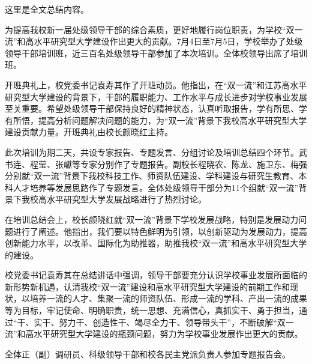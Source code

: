 
\begin{summary}

这里是全文总结内容。

为提高我校新一届处级领导干部的综合素质，更好地履行岗位职责，为学校“双一流”和高水平研究型大学建设作出更大的贡献。7月4日至7月5日，学校举办了处级领导干部培训班，近三百名处级领导干部参加了本次培训。全体校领导出席了培训班。

开班典礼上，校党委书记袁寿其作了开班动员。他指出，在“双一流”和江苏高水平研究型大学建设的背景下，干部的履职能力、工作水平与成长进步对学校事业发展至关重要。希望处级领导干部保持良好的精神状态，认真听取报告，学有所思、学有所悟，提高分析问题解决问题的能力，为“双一流”背景下我校高水平研究型大学建设贡献力量。开班典礼由校长颜晓红主持。

此次培训为期二天，共设专家报告、专题发言、分组讨论及培训总结四个环节。武书连、程莹、张巘等专家分别作了专题报告。副校长程晓农、陈龙、施卫东、梅强分别就“双一流”背景下我校科技工作、师资队伍建设、学科建设与研究生教育、本科人才培养等发展思路作了专题发言。全体处级领导干部分为11个组就“双一流”背景下我校高水平研究型大学发展战略进行了热烈讨论。      

在培训总结会上，校长颜晓红就“双一流”背景下学校发展战略，特别是发展动力问题进行了阐述。他指出，我们要以特色鲜明为引领，以创新驱动为发展动力，提高创新能力水平，以改革、国际化为助推器，助推我校“双一流”和高水平研究型大学的建设。

校党委书记袁寿其在总结讲话中强调，领导干部要充分认识学校事业发展所面临的新形势新机遇，认清我校“双一流”建设和高水平研究型大学建设的前期工作和现状，以培养一流的人才、集聚一流的师资队伍、形成一流的学科、产出一流的成果等为目标，牢记使命、明确职责，统一思想、充满信心，真抓实干、勇于担当，通过“干、实干、努力干、创造性干、竭尽全力干、领导带头干”，不断破解“双一流”和高水平研究型大学建设的瓶颈问题，努力为学校事业发展作出更大的贡献。

全体正（副）调研员、科级领导干部和校各民主党派负责人参加专题报告会。

\end{summary}
